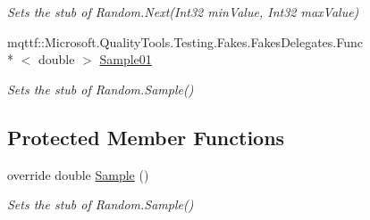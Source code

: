 \begin{DoxyCompactItemize}
\begin{DoxyCompactList}\small\item\em Sets the stub of Random.\-Next(\-Int32 min\-Value, Int32 max\-Value)\end{DoxyCompactList}\item 
mqttf\-::\-Microsoft.\-Quality\-Tools.\-Testing.\-Fakes.\-Fakes\-Delegates.\-Func\\*
$<$ double $>$ \hyperlink{class_system_1_1_fakes_1_1_stub_random_ad92271d242b1d4ce7948697d4a0239ff}{Sample01}
\begin{DoxyCompactList}\small\item\em Sets the stub of Random.\-Sample()\end{DoxyCompactList}\end{DoxyCompactItemize}
\subsection*{Protected Member Functions}
\begin{DoxyCompactItemize}
\item 
override double \hyperlink{class_system_1_1_fakes_1_1_stub_random_a381dabecbe24b387f4864939e12a2a37}{Sample} ()
\begin{DoxyCompactList}\small\item\em Sets the stub of Random.\-Sample()\end{DoxyCompactList}\end{DoxyCompactItemize}
